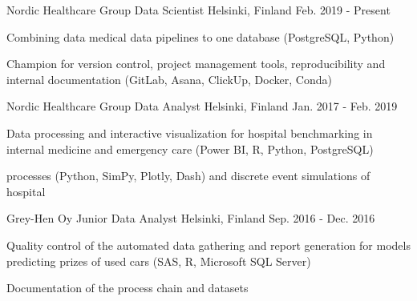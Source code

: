 \begin{cventries}
  \cventry
    {Nordic Healthcare Group} %
    {Data Scientist} %
    {Helsinki, Finland} %
    {Feb. 2019 - Present} %
    {
      \begin{cvitems} %
        \item {Combining data medical data pipelines to one database
        (PostgreSQL, Python)}
        \item {Champion for version control, project management tools,
        reproducibility and internal documentation (GitLab, Asana, ClickUp, Docker, Conda)}
      \end{cvitems}
    }

  \cventry
    {Nordic Healthcare Group} %
    {Data Analyst} %
    {Helsinki, Finland} %
    {Jan. 2017 - Feb. 2019} %
    {
      \begin{cvitems} %
        \item {Data processing and interactive visualization for hospital benchmarking
        in internal medicine and emergency care (Power BI, R, Python, PostgreSQL)}
        \item {processes (Python, SimPy, Plotly, Dash)}
        and discrete event simulations of hospital
      \end{cvitems}
    }

  \cventry
    {Grey-Hen Oy} %
    {Junior Data Analyst} %
    {Helsinki, Finland} %
    {Sep. 2016 - Dec. 2016} %
    {
      \begin{cvitems} %
        \item {Quality control of the automated data gathering and report generation
        for models predicting prizes of used cars (SAS, R, Microsoft SQL Server)}
        \item {Documentation of the process chain and datasets}
      \end{cvitems}
    }


\end{cventries}
